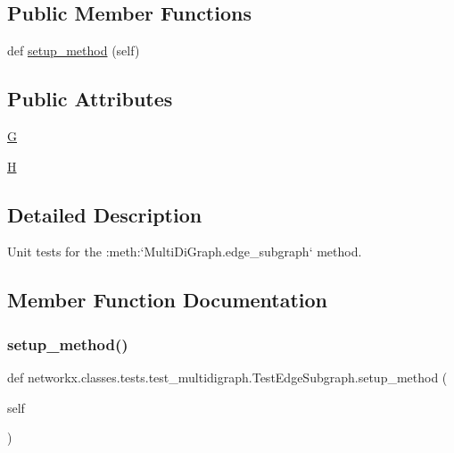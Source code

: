 \subsection*{Public Member Functions}
\begin{DoxyCompactItemize}
\item 
def \hyperlink{classnetworkx_1_1classes_1_1tests_1_1test__multidigraph_1_1TestEdgeSubgraph_a7b642bf7014d71a0c3950b2314109519}{setup\+\_\+method} (self)
\end{DoxyCompactItemize}
\subsection*{Public Attributes}
\begin{DoxyCompactItemize}
\item 
\hyperlink{classnetworkx_1_1classes_1_1tests_1_1test__multidigraph_1_1TestEdgeSubgraph_af2d83216716b09853f17561aab1ed1d1}{G}
\item 
\hyperlink{classnetworkx_1_1classes_1_1tests_1_1test__multidigraph_1_1TestEdgeSubgraph_afcab92b66184e015822515b4c6b08e45}{H}
\end{DoxyCompactItemize}


\subsection{Detailed Description}
\begin{DoxyVerb}Unit tests for the :meth:`MultiDiGraph.edge_subgraph` method.\end{DoxyVerb}
 

\subsection{Member Function Documentation}
\mbox{\label{classnetworkx_1_1classes_1_1tests_1_1test__multidigraph_1_1TestEdgeSubgraph_a7b642bf7014d71a0c3950b2314109519}} 
\subsubsection{\texorpdfstring{setup\+\_\+method()}{setup\_method()}}
{\footnotesize\ttfamily def networkx.\+classes.\+tests.\+test\+\_\+multidigraph.\+Test\+Edge\+Subgraph.\+setup\+\_\+method (\begin{DoxyParamCaption}\item[{}]{self }\end{DoxyParamCaption})}



